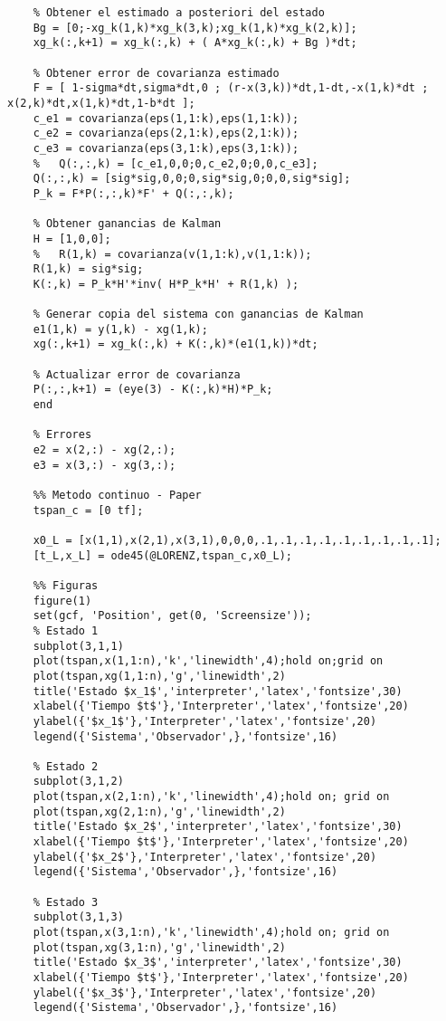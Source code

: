 \begin{verbatim}
	% Obtener el estimado a posteriori del estado
	Bg = [0;-xg_k(1,k)*xg_k(3,k);xg_k(1,k)*xg_k(2,k)];
	xg_k(:,k+1) = xg_k(:,k) + ( A*xg_k(:,k) + Bg )*dt;
	
	% Obtener error de covarianza estimado
	F = [ 1-sigma*dt,sigma*dt,0 ; (r-x(3,k))*dt,1-dt,-x(1,k)*dt ; x(2,k)*dt,x(1,k)*dt,1-b*dt ];
	c_e1 = covarianza(eps(1,1:k),eps(1,1:k));
	c_e2 = covarianza(eps(2,1:k),eps(2,1:k));
	c_e3 = covarianza(eps(3,1:k),eps(3,1:k));
	%   Q(:,:,k) = [c_e1,0,0;0,c_e2,0;0,0,c_e3];
	Q(:,:,k) = [sig*sig,0,0;0,sig*sig,0;0,0,sig*sig];
	P_k = F*P(:,:,k)*F' + Q(:,:,k);
	
	% Obtener ganancias de Kalman
	H = [1,0,0];
	%   R(1,k) = covarianza(v(1,1:k),v(1,1:k));
	R(1,k) = sig*sig;
	K(:,k) = P_k*H'*inv( H*P_k*H' + R(1,k) );
	
	% Generar copia del sistema con ganancias de Kalman
	e1(1,k) = y(1,k) - xg(1,k);
	xg(:,k+1) = xg_k(:,k) + K(:,k)*(e1(1,k))*dt;
	
	% Actualizar error de covarianza
	P(:,:,k+1) = (eye(3) - K(:,k)*H)*P_k;  
	end
	
	% Errores
	e2 = x(2,:) - xg(2,:);
	e3 = x(3,:) - xg(3,:);
	
	%% Metodo continuo - Paper
	tspan_c = [0 tf];
	
	x0_L = [x(1,1),x(2,1),x(3,1),0,0,0,.1,.1,.1,.1,.1,.1,.1,.1,.1];
	[t_L,x_L] = ode45(@LORENZ,tspan_c,x0_L);
	
	%% Figuras
	figure(1)
	set(gcf, 'Position', get(0, 'Screensize'));
	% Estado 1
	subplot(3,1,1)
	plot(tspan,x(1,1:n),'k','linewidth',4);hold on;grid on
	plot(tspan,xg(1,1:n),'g','linewidth',2)
	title('Estado $x_1$','interpreter','latex','fontsize',30)
	xlabel({'Tiempo $t$'},'Interpreter','latex','fontsize',20)
	ylabel({'$x_1$'},'Interpreter','latex','fontsize',20)
	legend({'Sistema','Observador',},'fontsize',16)
	
	% Estado 2
	subplot(3,1,2)
	plot(tspan,x(2,1:n),'k','linewidth',4);hold on; grid on
	plot(tspan,xg(2,1:n),'g','linewidth',2)
	title('Estado $x_2$','interpreter','latex','fontsize',30)
	xlabel({'Tiempo $t$'},'Interpreter','latex','fontsize',20)
	ylabel({'$x_2$'},'Interpreter','latex','fontsize',20)
	legend({'Sistema','Observador',},'fontsize',16)
	
	% Estado 3
	subplot(3,1,3)
	plot(tspan,x(3,1:n),'k','linewidth',4);hold on; grid on
	plot(tspan,xg(3,1:n),'g','linewidth',2)
	title('Estado $x_3$','interpreter','latex','fontsize',30)
	xlabel({'Tiempo $t$'},'Interpreter','latex','fontsize',20)
	ylabel({'$x_3$'},'Interpreter','latex','fontsize',20)
	legend({'Sistema','Observador',},'fontsize',16)
	

\end{verbatim}
